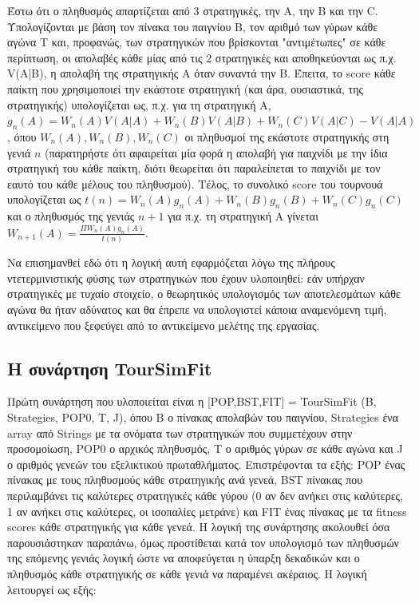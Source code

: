 \documentclass[12pt]{article}
\begin{document}
Έστω ότι ο πληθυσμός απαρτίζεται από 3 στρατηγικές, την A, την B και την C. Υπολογίζονται με βάση τον πίνακα του παιγνίου B, τον αριθμό των γύρων κάθε αγώνα T και, προφανώς, των στρατηγικών που βρίσκονται "αντιμέτωπες" σε κάθε περίπτωση, οι απολαβές κάθε μίας από τις 2 στρατηγικές και αποθηκεύονται ως π.χ. V(A|B), η απολαβή της στρατηγικής A όταν συναντά την B. Έπειτα, το score κάθε παίκτη που χρησιμοποιεί την εκάστοτε στρατηγική (και άρα, ουσιαστικά, της στρατηγικής) υπολογίζεται ως, π.χ. για τη στρατηγική A, $g_n(A) = W_n(A)V(A|A) + W_n(B)V(A|B) + W_n(C)V(A|C) − V(A|A)$ , όπου $W_n(A), W_n(B), W_n(C)$ οι πληθυσμοί της εκάστοτε στρατηγικής στη γενιά $n$ (παρατηρήστε ότι αφαιρείται μία φορά η απολαβή για παιχνίδι με την ίδια στρατηγική του κάθε παίκτη, διότι θεωρείται ότι παραλείπεται το παιχνίδι με τον εαυτό του κάθε μέλους του πληθυσμού). Τέλος, το συνολικό score του τουρνουά υπολογίζεται ως $t(n) = W_n(A)g_n(A) + W_n(B)g_n(B) + W_n(C)g_n(C)$ και ο πληθυσμός της γενιάς $n+1$ για π.χ. τη στρατηγική A γίνεται $W_{n+1}(A) = \frac{\Pi W_n(A)g_n(A)}{t(n)}$. 

Να επισημανθεί εδώ ότι η λογική αυτή εφαρμόζεται λόγω της πλήρους ντετερμινιστικής φύσης των στρατηγικών που έχουν υλοποιηθεί: εάν υπήρχαν στρατηγικές με τυχαίο στοιχείο, ο θεωρητικός υπολογισμός των αποτελεσμάτων κάθε αγώνα θα ήταν αδύνατος και θα έπρεπε να υπολογιστεί κάποια αναμενόμενη τιμή, αντικείμενο που ξεφεύγει από το αντικείμενο μελέτης της εργασίας.
\subsection{Η συνάρτηση TourSimFit}
Πρώτη συνάρτηση που υλοποιείται είναι η [POP,BST,FIT]\- =\- TourSimFit\- (B,\- Strategies,\- POP0,\- T, \-J), όπου B ο πίνακας απολαβών του παιγνίου, Strategies ένα array από Strings με τα ονόματα των στρατηγικών που συμμετέχουν στην προσομοίωση, POP0 ο αρχικός πληθυσμός, T ο αριθμός γύρων σε κάθε αγώνα και J ο αριθμός γενεών του εξελικτικού πρωταθλήματος. Επιστρέφονται τα εξής: POP ένας πίνακας με τους πληθυσμούς κάθε στρατηγικής ανά γενεά, BST πίνακας που περιλαμβάνει τις καλύτερες στρατηγικές κάθε γύρου (0 αν δεν ανήκει στις καλύτερες, 1 αν ανήκει στις καλύτερες, οι ισοπαλίες μετράνε) και FIT ένας πίνακας με τα fitness scores κάθε στρατηγικής για κάθε γενεά. Η λογική της συνάρτησης ακολουθεί όσα παρουσιάστηκαν παραπάνω, όμως προστίθεται κατά τον υπολογισμό των πληθυσμών της επόμενης γενιάς λογική ώστε να αποφεύγεται η ύπαρξη δεκαδικών και ο πληθυσμός κάθε στρατηγικής σε κάθε γενιά να παραμένει ακέραιος. Η λογική λειτουργεί ως εξής:
\end{document}
